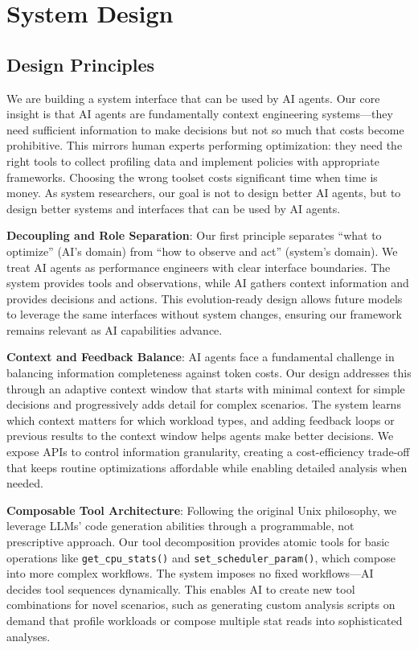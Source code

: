 \section{System Design}
\label{sec:design}

\subsection{Design Principles}

We are building a system interface that can be used by AI agents. Our core insight is that AI agents are fundamentally context engineering systems—they need sufficient information to make decisions but not so much that costs become prohibitive. This mirrors human experts performing optimization: they need the right tools to collect profiling data and implement policies with appropriate frameworks. Choosing the wrong toolset costs significant time when time is money. As system researchers, our goal is not to design better AI agents, but to design better systems and interfaces that can be used by AI agents.

\textbf{Decoupling and Role Separation}: Our first principle separates ``what to optimize'' (AI's domain) from ``how to observe and act'' (system's domain). We treat AI agents as performance engineers with clear interface boundaries. The system provides tools and observations, while AI gathers context information and provides decisions and actions. This evolution-ready design allows future models to leverage the same interfaces without system changes, ensuring our framework remains relevant as AI capabilities advance.

\textbf{Context and Feedback Balance}: AI agents face a fundamental challenge in balancing information completeness against token costs. Our design addresses this through an adaptive context window that starts with minimal context for simple decisions and progressively adds detail for complex scenarios. The system learns which context matters for which workload types, and adding feedback loops or previous results to the context window helps agents make better decisions. We expose APIs to control information granularity, creating a cost-efficiency trade-off that keeps routine optimizations affordable while enabling detailed analysis when needed.

\textbf{Composable Tool Architecture}: Following the original Unix philosophy, we leverage LLMs' code generation abilities through a programmable, not prescriptive approach. Our tool decomposition provides atomic tools for basic operations like \texttt{get\_cpu\_stats()} and \texttt{set\_scheduler\_param()}, which compose into more complex workflows. The system imposes no fixed workflows—AI decides tool sequences dynamically. This enables AI to create new tool combinations for novel scenarios, such as generating custom analysis scripts on demand that profile workloads or compose multiple stat reads into sophisticated analyses.

